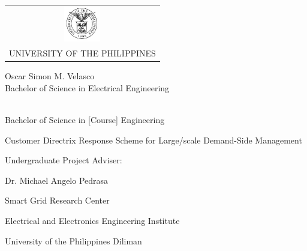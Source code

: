 \newpage
\thispagestyle{empty}

\noindent \begin{center}
\begin{tabular}{c}
\includegraphics[width=0.625in]{198_199_frontmatter/UP_logo_maroon.jpg}\tabularnewline
UNIVERSITY OF THE PHILIPPINES\tabularnewline
\end{tabular}
\par\end{center}

\vspace*{\fill}


\begin{center}
Oscar Simon M. Velasco \\
Bachelor of Science in Electrical Engineering 
\par
\par
[Student/s Name] \\ 
Bachelor of Science in [Course] Engineering 
\par
\par
\end{center}

\begin{center}
Customer Directrix Response Scheme for Large\-/scale Demand-Side Management
\par\end{center}

\vspace*{\fill}

\begin{center}
Undergraduate Project Adviser:\\\par
\par\end{center}

\begin{center}
Dr. Michael  Angelo Pedrasa
\end{center}

\begin{center}
Smart Grid Research Center\\ \par
Electrical and Electronics Engineering Institute \\\par
University of the Philippines Diliman
\par\end{center}

